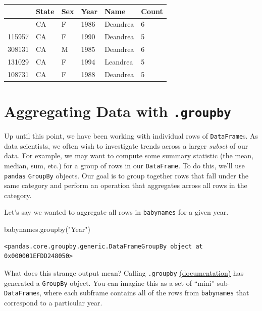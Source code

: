 \documentclass[
  letterpaper,
  DIV=11,
  numbers=noendperiod]{scrreprt}
\newenvironment{Shaded}{\begin{snugshade}}{\end{snugshade}}
\newcommand{\NormalTok}[1]{\textcolor[rgb]{0.00,0.23,0.31}{#1}}
\newcommand{\StringTok}[1]{\textcolor[rgb]{0.13,0.47,0.30}{#1}}
\begin{document}
\begin{longtable}[]{@{}llllll@{}}
\toprule\noalign{}
& State & Sex & Year & Name & Count \\
\midrule\noalign{}
\endhead
\bottomrule\noalign{}
\endlastfoot
101976 & CA & F & 1986 & Deandrea & 6 \\
115957 & CA & F & 1990 & Deandrea & 5 \\
308131 & CA & M & 1985 & Deandrea & 6 \\
131029 & CA & F & 1994 & Leandrea & 5 \\
108731 & CA & F & 1988 & Deandrea & 5 \\
\end{longtable}

\section{\texorpdfstring{Aggregating Data with
\texttt{.groupby}}{Aggregating Data with .groupby}}\label{aggregating-data-with-.groupby}

Up until this point, we have been working with individual rows of
\texttt{DataFrame}s. As data scientists, we often wish to investigate
trends across a larger \emph{subset} of our data. For example, we may
want to compute some summary statistic (the mean, median, sum, etc.) for
a group of rows in our \texttt{DataFrame}. To do this, we'll use
\texttt{pandas} \texttt{GroupBy} objects. Our goal is to group together
rows that fall under the same category and perform an operation that
aggregates across all rows in the category.

Let's say we wanted to aggregate all rows in \texttt{babynames} for a
given year.

\begin{Shaded}
\begin{Highlighting}[]
\NormalTok{babynames.groupby(}\StringTok{"Year"}\NormalTok{)}
\end{Highlighting}
\end{Shaded}

\begin{verbatim}
<pandas.core.groupby.generic.DataFrameGroupBy object at 0x000001EFDD248050>
\end{verbatim}

What does this strange output mean? Calling \texttt{.groupby}
\href{https://pandas.pydata.org/pandas-docs/stable/reference/api/pandas.DataFrame.groupby.html}{(documentation)}
has generated a \texttt{GroupBy} object. You can imagine this as a set
of ``mini'' sub-\texttt{DataFrame}s, where each subframe contains all of
the rows from \texttt{babynames} that correspond to a particular year.
\end{document}
